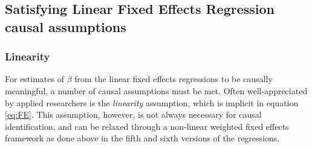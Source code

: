 \documentclass[12pt]{article}\usepackage[]{graphicx}\usepackage[]{color}
\newcommand{\1}{\mathbbm{1}}
\begin{document}
\subsection{Satisfying Linear Fixed Effects Regression causal assumptions}
\label{sec:assumptions}

\subsubsection{Linearity}
For estimates of $\beta$ from the linear fixed effects regressions to be causally meaningful, a number of causal assumptions must be met. Often well-appreciated by applied researchers is the \textit{linearity} assumption, which is implicit in equation \ref{eq:FE}. This assumption, however, is not always necessary for causal identification, and can be relaxed through a non-linear weighted fixed effects framework as done above in the fifth and sixth versions of the regressions. 
\end{document}
